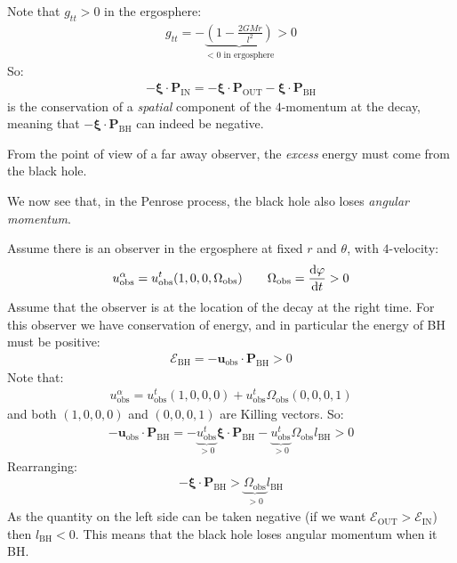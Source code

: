 \documentclass[../template.tex]{subfiles}
\begin{document}
Note that $g_{tt} > 0$ in the ergosphere:
\begin{align*}
    g_{t t} = -\underbrace{\left(1-\frac{2GMr}{l^2} \right)}_{<0 
\text{ in ergosphere}} > 0
\end{align*} 
So:
\begin{align*}
    -\bm{\xi}\cdot\bm{P}_{\mathrm{IN} } = -\bm{\xi} \cdot \bm{P_{\mathrm{OUT} }} - \bm{\xi}\cdot \bm{P_{\mathrm{BH} }}
\end{align*}
is the conservation of a \textit{spatial} component of the $4$-momentum at the decay, meaning that $-\bm{\xi}\cdot \bm{P_
\mathrm{BH} }$ can indeed be negative.   

From the point of view of a far away observer, the \textit{excess} energy must come from the black hole.

\medskip

We now see that, in the Penrose process, the black hole also loses \textit{angular momentum}.

Assume there is an observer in the ergosphere at fixed $r$ and $\theta$, with $4$-velocity:
\begin{align*}
    u^\alpha_{\mathrm{obs}} = u^t_{\mathrm{obs}}(1,0,0,\Omega_{\mathrm{obs} }) \qquad \Omega_{\mathrm{obs} } = \dv{\varphi}{t} > 0
\end{align*}  
Assume that the observer is at the location of the decay at the right time. For this observer we have conservation of energy, and in particular the energy of BH must be positive:
\begin{align*}
    \mathcal{E}_{\mathrm{BH}} = - \bm{u}_{\mathrm{obs}}\cdot \bm{P_{\mathrm{BH} }} > 0
\end{align*} 
Note that:
\begin{align*}
    u^\alpha_{\mathrm{obs} } = u^t_{\mathrm{obs} }(1,0,0,0) + u^t_{\mathrm{obs} }\Omega_{\mathrm{obs} }(0,0,0,1)
\end{align*}
and both $(1,0,0,0)$ and $(0,0,0,1)$ are Killing vectors. So:
\begin{align*}
    -\bm{u_{\mathrm{obs} }} \cdot \bm{P_{\mathrm{BH} }} = -\underbrace{u^t_{\mathrm{obs} } }_{>0}\bm{\xi} \cdot \bm{P_{\mathrm{BH} }} - \underbrace{u^t_{\mathrm{obs} } }_{>0}\Omega_{\mathrm{obs} } l_{\mathrm{BH} } > 0
\end{align*} 
Rearranging:
\begin{align*}
    -\bm{\xi} \cdot \bm{P_{\mathrm{BH} }} > \underbrace{\Omega_{\mathrm{obs} }}_{>0}  l_{\mathrm{BH} }
\end{align*}
As the quantity on the left side can be taken negative (if we want $\mathcal{E}_\mathrm{OUT} > \mathcal{E}_{\mathrm{IN} }$) then $l_{\mathrm{BH} } < 0$. This means that the black hole loses angular momentum when it  BH.  
\end{document}
